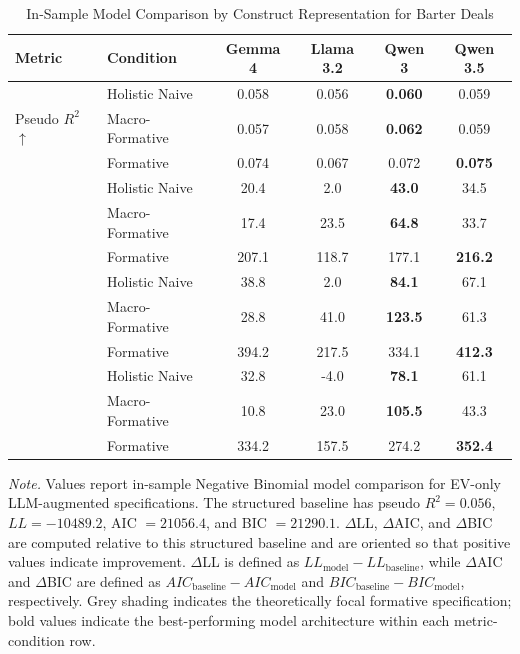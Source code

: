 \begin{table}[h]
    \centering
    \caption{In-Sample Model Comparison by Construct Representation for Barter Deals}
    \label{tab:barter_insample_compact}
    \begin{tabular}{llcccc}
    \toprule
    Metric & Condition & Gemma 4 & Llama 3.2 & Qwen 3 & Qwen 3.5 \\
    \midrule
    \multirow{3}{*}{Pseudo $R^2$ $\uparrow$} & Holistic Naive  & 0.058 & 0.056 & \textbf{0.060} & 0.059 \\
     & Macro-Formative & 0.057 & 0.058 & \textbf{0.062} & 0.059 \\
     \rowcolor{focalrow}
     & Formative       & 0.074 & 0.067 & 0.072 & \textbf{0.075} \\
    \addlinespace[0.5em]
    \multirow{3}{*}{$\Delta$LL $\uparrow$} & Holistic Naive  & 20.4 & 2.0 & \textbf{43.0} & 34.5 \\
     & Macro-Formative & 17.4 & 23.5 & \textbf{64.8} & 33.7 \\
     \rowcolor{focalrow}
     & Formative       & 207.1 & 118.7 & 177.1 & \textbf{216.2} \\
    \addlinespace[0.5em]
    \multirow{3}{*}{$\Delta$AIC $\uparrow$} & Holistic Naive  & 38.8 & 2.0 & \textbf{84.1} & 67.1 \\
     & Macro-Formative & 28.8 & 41.0 & \textbf{123.5} & 61.3 \\
     \rowcolor{focalrow}
     & Formative       & 394.2 & 217.5 & 334.1 & \textbf{412.3} \\
    \addlinespace[0.5em]
    \multirow{3}{*}{$\Delta$BIC $\uparrow$} & Holistic Naive  & 32.8 & -4.0 & \textbf{78.1} & 61.1 \\
     & Macro-Formative & 10.8 & 23.0 & \textbf{105.5} & 43.3 \\
     \rowcolor{focalrow}
     & Formative       & 334.2 & 157.5 & 274.2 & \textbf{352.4} \\
    \bottomrule
    \end{tabular}

    \begin{flushleft}
    \footnotesize
    \textit{Note.} Values report in-sample Negative Binomial model comparison for EV-only LLM-augmented specifications. The structured baseline has pseudo $R^2 = 0.056$, $LL = -10489.2$, AIC $= 21056.4$, and BIC $= 21290.1$. $\Delta$LL, $\Delta$AIC, and $\Delta$BIC are computed relative to this structured baseline and are oriented so that positive values indicate improvement. $\Delta$LL is defined as $LL_{\text{model}} - LL_{\text{baseline}}$, while $\Delta$AIC and $\Delta$BIC are defined as $AIC_{\text{baseline}} - AIC_{\text{model}}$ and $BIC_{\text{baseline}} - BIC_{\text{model}}$, respectively. Grey shading indicates the theoretically focal formative specification; bold values indicate the best-performing model architecture within each metric-condition row.
    \end{flushleft}
\end{table}

